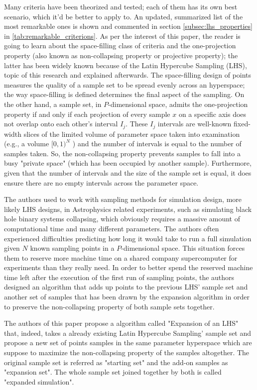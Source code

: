 \documentclass[12pt]{article}
\begin{document}
Many criteria have been theorized and tested; each of them has its own best scenario, which it'd be better to apply to. An updated, summarized list of the most remarkable ones is shown and commented in section \cref{subsec:lhs_properties} in \cref{tab:remarkable_criterions}. As per the interest of this paper, the reader is going to learn about the space-filling class of criteria and the one-projection property (also known as non-collapsing property or projective property); the latter has been widely known because of the Latin Hypercube Sampling (LHS), topic of this research and explained afterwards. The space-filling design of points measures the quality of a sample set to be spread evenly across an hyperspace; the way space-filling is defined determines the final aspect of the sampling. On the other hand, a sample set, in $P$-dimensional space, admits the one-projection property if and only if each projection of every sample $x$ on a specific axis does not overlap onto each other's interval $I_j$. These $I_j$ intervals are well-known fixed-width slices of the limited volume of parameter space taken into examination (e.g., a volume $[0,1)^N$ ) and the number of intervals is equal to the number of samples taken. So, the non-collapsing property prevents samples to fall into a busy "private space" (which has been occupied by another sample). Furthermore, given that the number of intervals and the size of the sample set is equal, it does ensure there are no empty intervals across the parameter space.

The authors used to work with sampling methods for simulation design, more likely LHS designs, in Astrophysics related experiments, such as simulating black hole binary systems collapsing, which obviously requires a massive amount of computational time and many different parameters. The authors often experienced difficulties predicting how long it would take to run a full simulation given $N$ known sampling points in a $P$-dimensional space. This situation forces them to reserve more machine time on a shared company supercomputer for experiments than they really need. In order to better spend the reserved machine time left after the execution of the first run of sampling points, the authors designed an algorithm that adds up points to the previous LHS' sample set and another set of samples that has been drawn by the expansion algorithm in order to preserve the non-collapsing property of both sample sets together.

The authors of this paper propose a algorithm called "Expansion of an LHS" that, indeed, takes a already existing Latin Hypercube Sampling' sample set and propose a new set of points samples in the same parameter hyperspace which are suppose to maximize the non-collapsing property of the samples altogether. 
The original sample set is referred as "starting set" and the add-on samples as "expansion set". The whole sample set joined together by both is called "expanded simulation".
\end{document}
